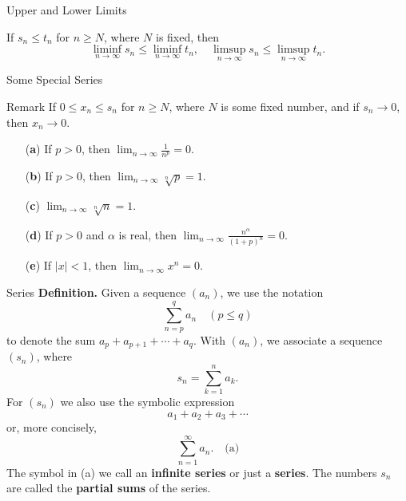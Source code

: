 \documentclass{beamer}
\begin{document}
\begin{frame}{Upper and Lower Limits} 

\begin{theorem}
If $s_n \leq t_n$ for $n \geq N$, where $N$ is fixed, then
\[
\liminf_{n \to \infty} s_n \leq \liminf_{n \to \infty} t_n, \quad
\limsup_{n \to \infty} s_n \leq \limsup_{n \to \infty} t_n.
\]
\end{theorem}
\end{frame}


\begin{frame}{Some Special Series}
  \begin{block}{Remark}
    If $0 \leq x_n \leq s_n$ for $n \geq N$, where $N$ is some fixed number, and
    if $s_n \to 0$, then $x_n \to 0$.
  \end{block}
  \begin{theorem}
\begin{enumerate}
    \item[(\textbf{a})] If $p > 0$, then $\lim_{n \to \infty} \frac{1}{n^p} = 0$.
    \item[(\textbf{b})] If $p > 0$, then $\lim_{n \to \infty} \sqrt[n]{p} = 1$.
    \item[(\textbf{c})] $\lim_{n \to \infty} \sqrt[n]{n} = 1$.
    \item[(\textbf{d})] If $p > 0$ and $\alpha$ is real, then $\lim_{n \to \infty} \frac{n^\alpha}{(1 + p)^n} = 0$.
    \item[(\textbf{e})] If $|x| < 1$, then $\lim_{n \to \infty} x^n = 0$.
\end{enumerate}
\end{theorem}
\end{frame}

\begin{frame}{Series}
  \textbf{Definition.} Given a sequence $(a_n)$, we use the notation
\[
\sum_{n=p}^{q} a_n \quad (p \leq q)
\]
to denote the sum $a_p + a_{p+1} + \cdots + a_q$. With $(a_n)$, we associate a sequence $(s_n)$, where
\[
s_n = \sum_{k=1}^{n} a_k.
\]
For $(s_n)$ we also use the symbolic expression
\[
a_1 + a_2 + a_3 + \cdots
\]
or, more concisely,
\[
\sum_{n=1}^{\infty} a_n. \quad \text{(a)}
\]
The symbol in (a) we call an \textbf{infinite series} or just a
\textbf{series}. The numbers $s_n$ are called the \textbf{partial sums} of the
series.
\end{frame}
\end{document}
